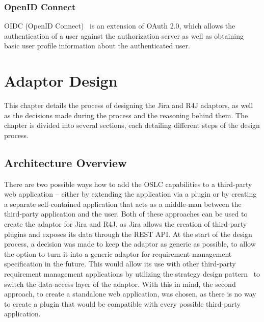 \subsection*{OpenID Connect}
OIDC (OpenID Connect) \cite{oidc} is an extension of OAuth 2.0, which allows the authentication of a user against the authorization server as well as obtaining basic user profile information about the authenticated user.


\chapter{Adaptor Design}
\label{chapter:adaptor_design}
This chapter details the process of designing the Jira and R4J adaptors, as well as the decisions made during the process and the reasoning behind them. The chapter is divided into several sections, each detailing different steps of the design process.

\section{Architecture Overview}
There are two possible ways how to add the OSLC capabilities to a third-party web application -- either by extending the application via a plugin or by creating a separate self-contained application that acts as a middle-man between the third-party application and the user. Both of these approaches can be used to create the adaptor for Jira and R4J, as Jira allows the creation of third-party plugins and exposes its data through the REST API. At the start of the design process, a decision was made to keep the adaptor as generic as possible, to allow the option to turn it into a generic adaptor for requirement management specification in the future. This would allow its use with other third-party requirement management applications by utilizing the strategy design pattern \cite{strategy_design_pattern} to switch the data-access layer of the adaptor. With this in mind, the second approach, to create a standalone web application, was chosen, as there is no way to create a plugin that would be compatible with every possible third-party application.

